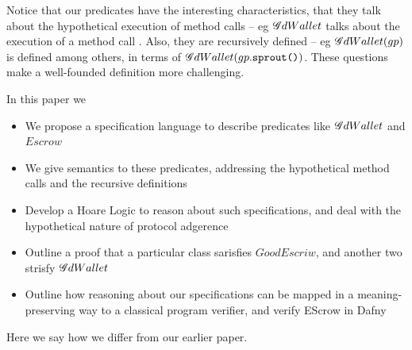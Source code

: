 \documentclass[acmsmall,review,anonymous,screen]{acmart}\settopmatter{printfolios=true,printacmref=false}
\begin{document}
 
Notice that our predicates have the  interesting characteristics, that  they talk about the hypothetical execution of method calls -- eg $\mathcal GdWallet$ talks about the execution of a method call . Also, they   are recursively defined -- eg $\mathcal GdWallet(gp)$  is defined among others, in terms of $\mathcal GdWallet(gp.\texttt{sprout()})$. These questions make a well-founded definition more challenging.

In this paper we 

\begin{itemize}
\item
We propose a specification language to describe predicates like $\mathcal GdWallet$ and $Escrow$
\item
We give semantics to these predicates, addressing the hypothetical method calls and the recursive definitions
\item
Develop a Hoare Logic to reason about such specifications, and deal with the hypothetical nature of protocol adgerence
\item
Outline a proof that a particular class sarisfies $GoodEscriw$, and another two strisfy $\mathcal GdWallet$
\item
Outline how reasoning about our specifications can be mapped in a meaning-preserving way to a classical program verifier, and verify EScrow in Dafny

\end{itemize}

Here we say how we differ from our earlier paper.

%
 
\end{document}
